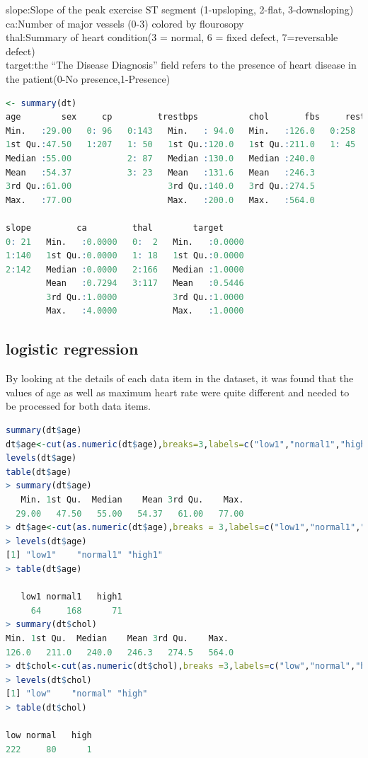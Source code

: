 \documentclass{article}
\begin{document}
slope:Slope of the peak exercise ST segment (1-upsloping, 2-flat, 3-downsloping)\\
ca:Number of major vessels (0-3) colored by flourosopy\\
thal:Summary of heart condition(3 = normal, 6 = fixed defect, 7=reversable defect)\\
target:the “The Disease Diagnosis” field refers to the presence of heart disease in the patient(0-No presence,1-Presence) 
\begin{lstlisting}[language=R]
<- summary(dt)
age        sex     cp         trestbps          chol       fbs     restecg    thalach      exang      oldpeak    
Min.   :29.00   0: 96   0:143   Min.   : 94.0   Min.   :126.0   0:258   0:147   Min.   : 71.0   0:204   Min.   :0.00  
1st Qu.:47.50   1:207   1: 50   1st Qu.:120.0   1st Qu.:211.0   1: 45   1:152   1st Qu.:133.5   1: 99   1st Qu.:0.00  
Median :55.00           2: 87   Median :130.0   Median :240.0           2:  4   Median :153.0           Median :0.80  
Mean   :54.37           3: 23   Mean   :131.6   Mean   :246.3                   Mean   :149.6           Mean   :1.04  
3rd Qu.:61.00                   3rd Qu.:140.0   3rd Qu.:274.5                   3rd Qu.:166.0           3rd Qu.:1.60  
Max.   :77.00                   Max.   :200.0   Max.   :564.0                   Max.   :202.0           Max.   :6.20  

slope         ca         thal        target      
0: 21   Min.   :0.0000   0:  2   Min.   :0.0000  
1:140   1st Qu.:0.0000   1: 18   1st Qu.:0.0000  
2:142   Median :0.0000   2:166   Median :1.0000  
        Mean   :0.7294   3:117   Mean   :0.5446  
        3rd Qu.:1.0000           3rd Qu.:1.0000  
        Max.   :4.0000           Max.   :1.0000  
\end{lstlisting}

\subsection{logistic regression}
By looking at the details of each data item in the dataset, it was found that the values of age as well as maximum heart rate were quite different and needed to be processed for both data items.
\begin{lstlisting}[language=R]
summary(dt$age)
dt$age<-cut(as.numeric(dt$age),breaks=3,labels=c("low1","normal1","high1"))
levels(dt$age)
table(dt$age)
> summary(dt$age)
   Min. 1st Qu.  Median    Mean 3rd Qu.    Max. 
  29.00   47.50   55.00   54.37   61.00   77.00 
> dt$age<-cut(as.numeric(dt$age),breaks = 3,labels=c("low1","normal1","high1"))
> levels(dt$age)
[1] "low1"    "normal1" "high1"  
> table(dt$age)

   low1 normal1   high1 
     64     168      71 
> summary(dt$chol)
Min. 1st Qu.  Median    Mean 3rd Qu.    Max. 
126.0   211.0   240.0   246.3   274.5   564.0 
> dt$chol<-cut(as.numeric(dt$chol),breaks =3,labels=c("low","normal","high"))
> levels(dt$chol)
[1] "low"    "normal" "high"  
> table(dt$chol)

low normal   high 
222     80      1 
\end{lstlisting}
\end{document}
